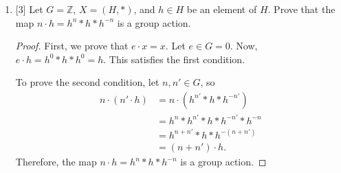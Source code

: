 \documentclass{article}
\newcommand{\inv}{^{-1}}
\newcommand{\normsub}{\lhd}
\begin{document}
\begin{enumerate}
{        \begin{proof}
            To begin, we note that for \(H\) to be a normal subgroup of \(G\), 
            \(H\) itself must be a group. So, we must show that \(H\) satisfies 
            the group axioms. First, associativity is inherited. Also notice that,
            by definition, \(e \in H\).

            Then, \(H\) is closed because for some \(h, h' \in H\), 
            \(h \cdot x = x\) and \(h' \cdot x = x\), so \(h \cdot (h' \cdot x) = x\).
            This means that \((h * h') \cdot x = x\), so \(h * h' \in H\). Thus,
            \(H\) is closed.

            Now, we must prove that for all \(h \in H\), \(h\inv \in H\). First, 
            we know that \(e \in H\), because \(e \cdot x = x\). Notice that 
            \(h\inv * h = e\), so \((h\inv * h) \cdot x = x\). By definition of 
            a group action, \((h\inv * h) \cdot x = h\inv \cdot h \cdot x = h\inv \cdot x = x\).
            Thus, \(h\inv \in H\).

            Now, to show that \(H \normsub G\), we must show that for any \(h, g\), 
            \(g * h * g\inv \in H\). Let use directly apply this expresion onto 
            some \(x \in X\) to get \(g \cdot h \cdot g\inv \cdot x\). Notice that 
            \(g\inv \cdot x \in X\), and \(h \cdot x' = x'\) for any \(x' \in X\).
            So, we can effectively remove \(h\) from the expression to get 
            \(g \cdot g\inv \cdot x = (g * g\inv) \cdot x = x\). Thus, \(g* h * g\inv \in H\), 
            so \(H \normsub G\).
        \end{proof}
    }

    \item {
        [3] Let \( G = \mathbb{Z} \), \( X = (H, *) \), and \( h \in H \) be an element of \( H \). 
        Prove that the map \(n \cdot h = h^n * h * h^{-n}\) is a group action.

        \begin{proof}
            First, we prove that \(e \cdot x = x\). Let \(e \in G = 0\). Now, 
            \(e \cdot h = h^0 *h *h^0 = h\). This satisfies the first condition.

            To prove the second condition, let \(n, n' \in G\), so 
            \begin{align}
                n \cdot (n' \cdot h) &= n \cdot (h^{n'} * h * h^{-n'}) \\
                                    &= h^n * h^{n'} * h * h^{-n'} * h^{-n} \\
                                    &= h^{n+n'} * h * h^{-(n+n')} \\
                                    &= (n + n') \cdot h.
            \end{align}
            Therefore, the map \(n \cdot h = h^n * h * h^{-n}\) is a group action.
        \end{proof}
    }
\end{enumerate}
  
\end{document}
